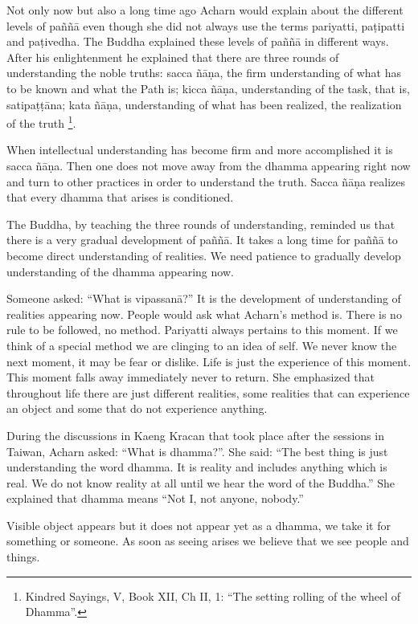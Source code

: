 \documentclass{book}
\begin{document}
Not only now but also a long time ago Acharn
would explain about the different levels of paññā even though she did
not always use the terms pariyatti,
paṭipatti and
paṭivedha. The 
Buddha explained these levels of paññā in different ways. After his
enlightenment he explained that there are three rounds of understanding
the noble truths: sacca ñāṇa, the firm understanding of
what has to be known and what the Path is; kicca
ñāṇa, understanding of the task,
that is, satipaṭṭāna; kata ñāṇa, understanding of what has
been realized, the realization of the truth
\footnote{Kindred Sayings, V, Book XII, Ch II, 1: ``The setting rolling of the
wheel of Dhamma''.}.

When intellectual understanding has
become firm and more accomplished it
is sacca ñāṇa.
Then one does not move away from the dhamma appearing right now and turn
to other practices in order to understand the truth. Sacca
ñāṇa realizes that every dhamma
that arises is conditioned. 

The
Buddha, by teaching the three rounds of understanding,
reminded us that there is a very gradual development of paññā. It takes
a long time for paññā to become direct understanding of realities.
We need patience to gradually develop
understanding of the dhamma appearing now.

Someone asked: ``What is vipassanā?'' It is
the development of understanding of realities appearing now. People
would ask what Acharn's method is. There is no rule to be followed, no
method. Pariyatti always pertains to this moment. If we think of a
special method we are clinging to an idea of self. We never know the
next moment, it may be fear or dislike. Life is just the experience of
this moment. This moment falls away immediately never to return. She
emphasized that throughout life there are just different realities, some
realities that can experience an object and some that do not experience
anything.

During the discussions in Kaeng Kracan that
took place after the sessions in Taiwan, Acharn asked: ``What is dhamma?''. She said: ``The best thing is just understanding the word
dhamma. It is reality and includes anything which is real. We do not
know reality at all until we hear the word of the Buddha.'' She
explained that dhamma means ``Not I, not anyone, nobody.'' 

Visible object appears but it does not
appear yet as a dhamma, we take it for something or someone. As soon as
seeing arises we believe that we see people and things. 
\end{document}
